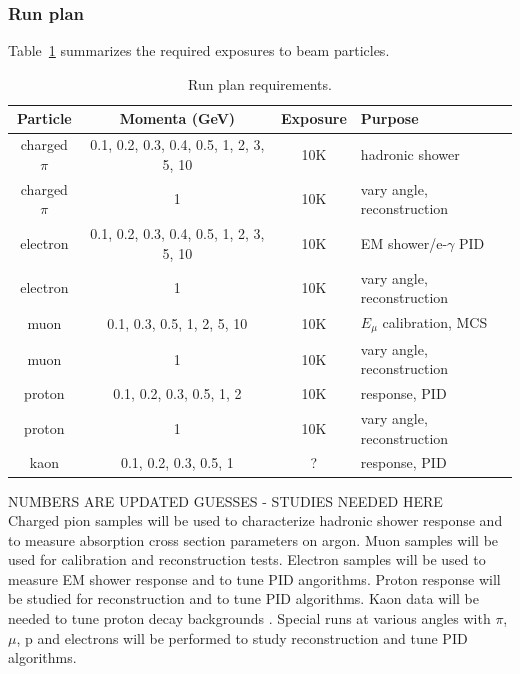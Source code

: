 \clearpage
\subsubsection {Run plan}

Table~\ref{tab:runplan} summarizes the required exposures to beam particles.
\begin{table}[h]
\centering
\begin{tabular}{|c|c|c|l|}
\hline
Particle & Momenta (GeV) & Exposure & Purpose \\ \hline
charged $\pi$       & 0.1, 0.2, 0.3, 0.4, 0.5, 1, 2, 3, 5, 10     &  10K  & hadronic shower \\ \hline
charged $\pi$ &  1  &  10K  & vary angle, reconstruction \\ \hline
electron       &    0.1, 0.2, 0.3, 0.4, 0.5, 1, 2, 3, 5, 10        &    10K   & EM shower/e-$\gamma$ PID     \\ \hline
electron &  1  &  10K  & vary angle, reconstruction \\ \hline
muon &   0.1, 0.3, 0.5, 1, 2, 5, 10  &  10K & $E_\mu$ calibration, MCS \\ \hline
muon &  1  &  10K  & vary angle, reconstruction \\ \hline
proton & 0.1, 0.2, 0.3, 0.5, 1, 2   &  10K & response, PID \\ \hline
proton &  1  &  10K & vary angle, reconstruction \\ \hline
kaon  & 0.1, 0.2, 0.3, 0.5, 1 & ?   &   response, PID  \\ \hline
\end{tabular}
\caption{Run plan requirements.}
\label{tab:runplan}
\end{table}

NUMBERS ARE UPDATED GUESSES - STUDIES NEEDED HERE \\
Charged pion samples will be used to characterize hadronic shower response and to measure
absorption cross section parameters on argon. Muon samples will be used for calibration and 
reconstruction tests. Electron samples will be used to measure EM shower response  
and to tune PID angorithms. Proton response will be studied for reconstruction and to tune PID 
algorithms. Kaon data will be needed to tune proton decay backgrounds .
Special runs at various angles with $\pi$, $\mu$, p and electrons will be performed to study reconstruction and tune PID algorithms. 

